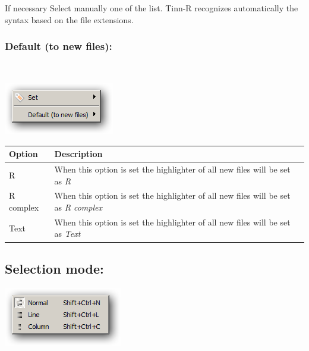 If necessary Select manually one of the list. Tinn-R recognizes
automatically the syntax based on the file extensions.


\hypertarget{menu_options_syntax_default}{}
\subsubsection{Default (to new files):}\\

\includegraphics[scale=0.50]{./res/menu_options_syntax.png}\\

\begin{scriptsize}\begin{tabularx}{\textwidth}{>{\hsize=0.2\hsize}X>{\hsize=0.8\hsize}X}\\
    \hline
    \textbf{Option} & \textbf{Description} \\
    \hline
    R & When this option is set the highlighter of all new files will be set as \textit{R} \\
    R complex & When this option is set the highlighter of all new files will be set as \textit{R complex} \\
    Text & When this option is set the highlighter of all new files will be set as \textit{Text} \\
    \hline
  \end{tabularx}\end{scriptsize}


\hypertarget{menu_options_selectionmode}{}
\subsection{Selection mode:}

\includegraphics[scale=0.50]{./res/menu_options_selectionmode.png}\\

